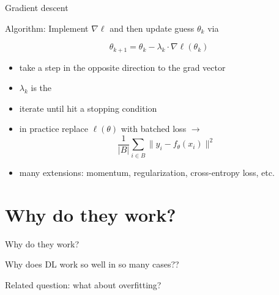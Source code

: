 \documentclass[xcolor=dvipsnames, 10pt]{beamer}
\begin{document}
\begin{frame}{Gradient descent}

    Algorithm: Implement $\nabla \ell$ and then update guess $\theta_k$ via
    
    \begin{equation*}
        \theta_{k+1} = \theta_k - \lambda_k \cdot \nabla \ell(\theta_k)
    \end{equation*}

    \begin{itemize}
        \item take a step in the opposite direction to the grad vector
        \vspace{0.5em}
        \item $\lambda_k$ is the  
        \vspace{0.5em}
        \item iterate until hit a stopping condition
        \vspace{0.5em}
        \item in practice replace $\ell(\theta)$ with batched loss $\to$
            \begin{equation*}
                \frac{1}{|B|}\sum_{i \in B} \|y_i - f_\theta(x_i)\|^2
            \end{equation*}
        \item many extensions: momentum, regularization, cross-entropy loss, etc.
    \end{itemize}


\end{frame}


\section{Why do they work?}

\begin{frame}{Why do they work?}

    Why does DL work so well in so many cases??

    \medskip
    \medskip
    \medskip
    
    Related question: what about overfitting?

\end{frame}
\end{document}
